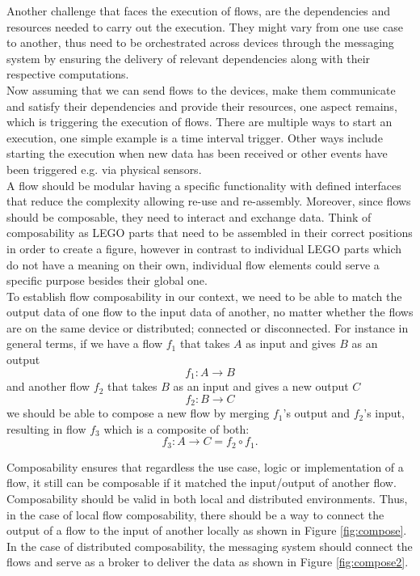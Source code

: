 \noindent Another challenge that faces the execution of  flows, are the dependencies and resources needed to carry out the execution.
 They might vary from one use case to another, thus need to be orchestrated across devices through the messaging system by  ensuring the delivery of relevant dependencies along with their respective computations.\\
 
\noindent Now assuming that we can send flows to the devices, make them communicate and satisfy their dependencies and provide their resources, one aspect remains, which is triggering the execution of flows. There are multiple ways to start an execution, one simple example is a time interval trigger. Other ways include starting the execution when new data has been received or other events have been triggered e.g. via physical sensors.\\


\noindent A flow should be modular having a specific functionality with defined interfaces that reduce the complexity allowing re-use and re-assembly. Moreover, since flows should be composable, they need to interact and exchange data. Think of composability as LEGO parts that need to be assembled in their correct positions in order to create a figure, however in contrast to individual LEGO parts which do not have a meaning on their own, individual flow elements could serve a specific purpose besides their global one. \\
 
\noindent  To establish flow composability in our context, we need to be able to match the output data of one flow to the input data of another, no matter whether the flows are on the same device or distributed; connected or disconnected. For instance in general terms, if we have a flow \(f_1\) that takes \(A\) as input and gives \(B\) as an output
\[ f_1 : A  \to B  \]
and another flow \(f_2\) that takes \(B\) as an input and gives a new output \(C\)
\[ f_2 : B  \to C  \]
we should be able to compose a new flow by merging  \(f_1\)'s output and  \(f_2\)'s input, resulting in flow \(f_3\) which is a composite of both:
\[f_3: A \to C = f_2 \circ f_1 .\]

 \noindent Composability ensures that regardless the use case, logic or implementation of a flow, it still can be composable if it matched the input/output of another flow. Composability should be valid in both local and distributed environments. Thus, in the case of local flow composability, there should be a way to connect the output of a flow to the input of another locally as shown in Figure \ref{fig:compose}. In the case of distributed composability, the messaging system should connect the flows and serve as a broker to deliver the data as shown in Figure \ref{fig:compose2}. 

